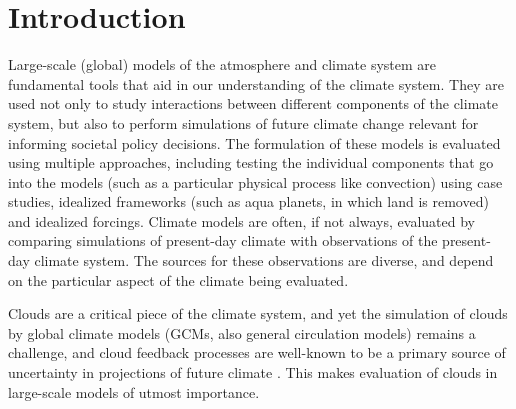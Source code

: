 \chapter{Introduction}\label{sec:introductionChapter}

Large-scale (global) models of the atmosphere and climate system are
fundamental tools that aid in our understanding of the climate system.
They are used not only to study interactions between different
components of the climate system, but also to perform simulations of
future climate change relevant for informing societal policy decisions.
The formulation of these models is evaluated using multiple approaches,
including testing the individual components that go into the models
(such as a particular physical process like convection) using case
studies, idealized frameworks (such as aqua planets, in which land is
removed) and idealized forcings. Climate models are often, if not
always, evaluated by comparing simulations of present-day climate with
observations of the present-day climate system. The sources for these
observations are diverse, and depend on the particular aspect of the
climate being evaluated.

Clouds are a critical piece of the climate system, and yet the
simulation of clouds by global climate models (GCMs, also general
circulation models) remains a challenge, and cloud feedback processes
are well-known to be a primary source of uncertainty in projections of
future climate
\citep{cess_et_al_1990, bony_and_dufresne_2005, williams_and_webb_2009, medeiros_et_al_2008, dufresne_and_bony_2008, bony_et_al_2006}.
This makes evaluation of clouds in large-scale models of utmost
importance.


